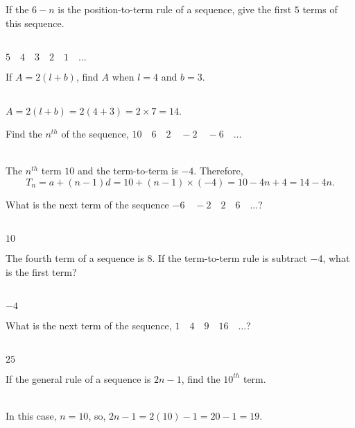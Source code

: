 \documentclass[addpoints,12pt]{exam}
\begin{document}
\begin{questions}
 \question If the $6-n$ is the position-to-term rule of a sequence, give the first $5$ terms of 
this sequence.
	\ifprintanswers
	  \begin{solution}\\
		$5 \quad 4 \quad 3 \quad 2 \quad 1 \quad \dots$
	  \end{solution}
	\else
	  \makeemptybox{1.33in}
	\fi
	
 \question If $A=2(l+b)$, find $A$ when $l=4$ and $b=3$.
	\ifprintanswers
	  \begin{solution}\\
		$A=2(l+b)=2(4+3)=2\times 7=14.$
	  \end{solution}
	\else
	  \makeemptybox{1.33in}
	\fi
 
 \question Find the $n^{th}$ of the sequence, $10 \quad 6 \quad 2 \quad -2 \quad -6 \quad \dots$
	\ifprintanswers
	  \begin{solution}\\
		The $n^{th}$ term $10$ and the term-to-term is $-4$. Therefore, 
$$T_n=a+(n-1)d=10+(n-1)\times(-4)=10-4n+4=14-4n.$$
	  \end{solution}
	\else
	  \makeemptybox{1.33in}
	\fi
	
 \question What is the next term of the sequence $-6 \quad -2 \quad 2 \quad 6 \quad \dots$?
	\ifprintanswers
	  \begin{solution}\\
		$10$
	  \end{solution}
	\else
	  \makeemptybox{1.33in}
	\fi
	
 \question The fourth term of a sequence is $8$. If the term-to-term rule is subtract $-4$, 
what is the first term?
	\ifprintanswers
	  \begin{solution}\\
		$-4$
	  \end{solution}
	\else
	  \makeemptybox{1.33in}
	\fi
 
 \question What is the next term of the sequence, $1 \quad 4 \quad 9 \quad 16 \quad \dots$?
	\ifprintanswers
	  \begin{solution}\\
		$25$
	  \end{solution}
	\else
	  \makeemptybox{1.33in}
	\fi
 
 \question If the general rule of a sequence is $2n-1$, find the $10^{th}$ term.
	\ifprintanswers
	  \begin{solution}\\
		In this case, $n=10$, so, $2n-1 = 2(10)-1=20-1=19.$
	  \end{solution}
	\else
	  \makeemptybox{1.33in}
	\fi
 

\end{questions}
\end{document}
